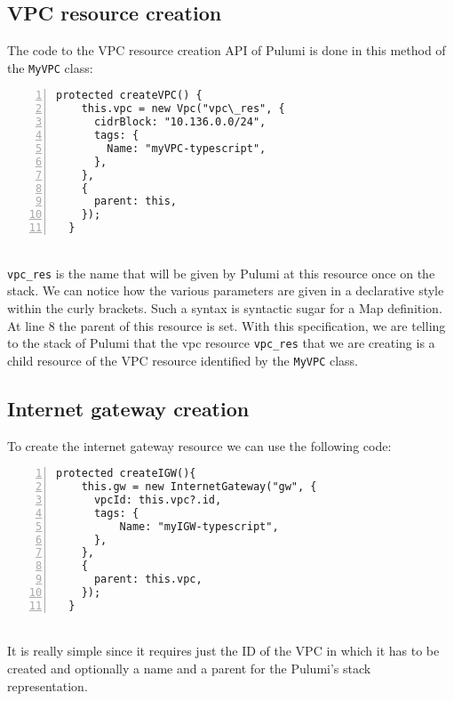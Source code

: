 \subsection{VPC resource creation}
The code to the VPC resource creation API of Pulumi is done in this method of the \texttt{MyVPC} class:
\begin{lstlisting}[numbers=left, numberstyle=\tiny, numbersep=-5pt, stepnumber=1]
  protected createVPC() {
    this.vpc = new Vpc("vpc\_res", {
      cidrBlock: "10.136.0.0/24",
      tags: {
        Name: "myVPC-typescript",
      },
    },
    {
      parent: this,
    });
  }
\end{lstlisting}\mbox{}\\
\texttt{vpc\_res} is the name that will be given by Pulumi at this resource once on the stack.
We can notice how the various parameters are given in a declarative style within the curly brackets.
Such a syntax is syntactic sugar for a Map definition.\\
At line 8 the parent of this resource is set.
With this specification, we are telling to the stack of Pulumi that the vpc resource \texttt{vpc\_res} that we are creating is a child resource of the VPC resource identified by the \texttt{MyVPC} class.

\subsection{Internet gateway creation}
To create the internet gateway resource we can use the following code:
\begin{lstlisting}[numbers=left, numberstyle=\tiny, numbersep=-5pt, stepnumber=1]
  protected createIGW(){
    this.gw = new InternetGateway("gw", {
      vpcId: this.vpc?.id,
      tags: {
          Name: "myIGW-typescript",
      },
    },
    {
      parent: this.vpc,
    });
  }
\end{lstlisting}\mbox{}\\
It is really simple since it requires just the ID of the VPC in which it has to be created and optionally a name and a parent for the Pulumi's stack representation.


